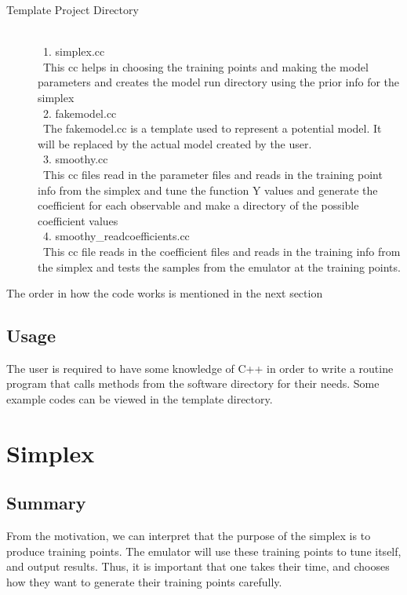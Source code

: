 \documentclass[12pt]{article}
\numberwithin{equation}{section}
\numberwithin{figure}{section}
\begin{document}
\begin{description}
\item[Template Project Directory] \
\\
\ 1. simplex.cc \\
\ This cc helps in choosing the training points and making the model parameters and creates the model run directory using the prior info for the simplex \\

\ 2. fakemodel.cc \\
\ The fakemodel.cc is a template used to represent a potential model. It will be replaced by the actual model created by the user. \\ 

\ 3. smoothy.cc \\
\ This cc files read in the parameter files and reads in the training point info from the simplex and tune the function Y values and generate the coefficient for each observable and make a directory of the possible coefficient values \\

\ 4. smoothy\_readcoefficients.cc \\
\ This cc file reads in the coefficient files and reads in the training info from the simplex and tests the samples from the emulator at the training points. \\

\end{description}

The order in how the code works is mentioned in the next section 


\subsection{Usage}
\label{sec:Usage}

The user is required to have some knowledge of C++ in order to write a routine program that calls methods from the software directory for their needs. Some example codes can be viewed in the template directory.

\section{Simplex}

\subsection{Summary}
From the motivation, we can interpret that the purpose of the simplex is to produce training points. The emulator will use these training points to tune itself, and output results. Thus, it is important that one takes their time, and chooses how they want to generate their training points carefully.
\end{document}
